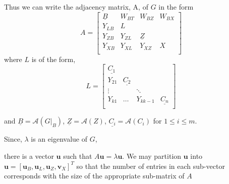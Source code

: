 \documentclass{paper}
\begin{document}
Thus we can write the adjacency matrix, A, of $G$ in the form
\[
A
=
\begin{bmatrix}
\underline{B} & W_{BT} & W_{BZ} & W_{BX} \\
Y_{LB} & L \\
Y_{ZB} & Y_{ZL} & \underline{Z} \\
Y_{XB} & Y_{XL} & Y_{XZ} & X \\
\end{bmatrix}
\]
where $L$ is of the form,
\[
L
= 
\begin{bmatrix}
\underline{C_1} \\
Y_{21} & \underline{C_2} \\
\vdots & & \ddots \\
Y_{k1} & \hdots & Y_{kk-1} & \underline{C_n} \\
\end{bmatrix}
\]

and $\underline{B} = \mathcal{A}(G|_B)$, $\underline{Z} = \mathcal{A}(Z)$, $\underline{C_i} =\mathcal{A}(C_i)$ for $1\leq i \leq m$.
\begin{bf} Since, $\lambda$ is an eigenvalue of $G$,\end{bf} 
there is a vector $\mathbf{u}$ such that $A\mathbf{u} = \lambda \mathbf{u}$. We may partition $\mathbf{u}$ into $\mathbf{u} = [\mathbf{u}_B, \mathbf{u}_{L}, \mathbf{u}_{Z}, \mathbf{v}_{X}]^{T}$ so that the number of entries in each sub-vector corresponds with the size of the appropriate sub-matrix of $A$
\end{document}
